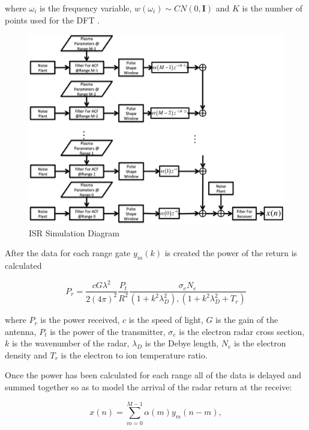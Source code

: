 \documentclass[draft,ras]{agutex}
\begin{document}
\begin{article}
\noindent where $\omega_i$ is the frequency variable, $w(\omega_i) \sim CN(0,\mathbf{I})$ and $K$ is the number of points used for the DFT \citep{michellnoisesim1981}.

\begin{figure}[!h]
\centering
\includegraphics[width=7.0in]{diagram}
\caption{ISR Simulation Diagram}
\label{fig:isrdiag}
\end{figure}


After the data for each range gate $y_m(k)$ is created the power of the return is calculated

\begin{equation}
\label{eq3}
P_r = \frac{cG \lambda^2}{2(4\pi)^2}\frac{P_t }{R^2}\frac{\sigma_e N_e}{(1+k^2\lambda_D^2),(1+k^2\lambda_D^2 + T_r)}
\end{equation}
 
 \noindent where $P_r$ is the power received, $c$ is the speed of light, $G$ is the gain of the antenna, $P_t$ is the power of the transmitter, $\sigma_e$ is the electron radar cross section, $k$ is the wavenumber of the radar, $\lambda_D$ is the Debye length, $N_e$ is the electron density and $T_r$ is the electron to ion temperature ratio.
  
Once the power has been calculated for each range all of the data is delayed and summed together so as to model the arrival of the radar return at the receive: 
 
\begin{equation}
\label{eq4}
x(n) = \displaystyle\sum\limits_{m =0}^{M-1} \alpha(m)y_m(n-m),
\end{equation}


\end{article}
\end{document}
